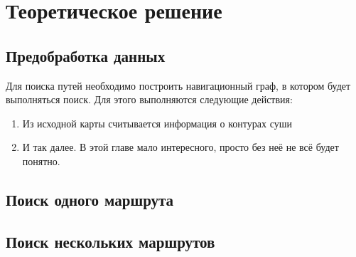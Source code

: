 \chapter{Теоретическое решение}

\section{Предобработка данных}

Для поиска путей необходимо построить навигационный граф, в котором
будет выполняться поиск. Для этого выполняются следующие действия:

\begin{enumerate}
    \item Из исходной карты считывается информация о контурах суши
    \item И так далее. В этой главе мало интересного, просто без неё
      не всё будет понятно.
\end{enumerate}

\FloatBarrier

\section{Поиск одного маршрута}

\FloatBarrier

\section{Поиск нескольких маршрутов}

\FloatBarrier

